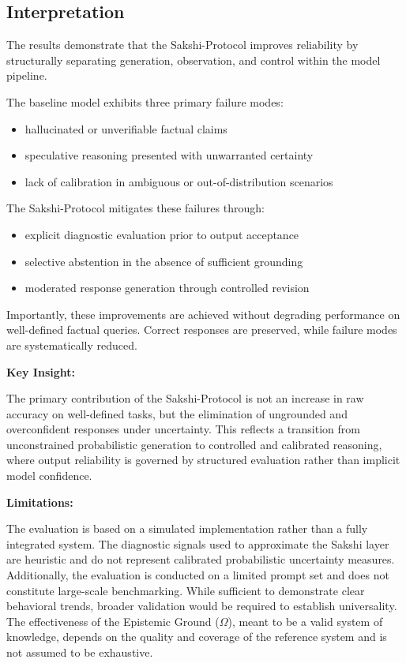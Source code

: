 \documentclass[12pt,a4paper]{article}
\begin{document}
\subsection{Interpretation}

The results demonstrate that the Sakshi-Protocol improves reliability by structurally separating generation, observation, and control within the model pipeline.

The baseline model exhibits three primary failure modes:
\begin{itemize}
\item hallucinated or unverifiable factual claims
\item speculative reasoning presented with unwarranted certainty
\item lack of calibration in ambiguous or out-of-distribution scenarios
\end{itemize}

The Sakshi-Protocol mitigates these failures through:
\begin{itemize}
\item explicit diagnostic evaluation prior to output acceptance
\item selective abstention in the absence of sufficient grounding
\item moderated response generation through controlled revision
\end{itemize}

Importantly, these improvements are achieved without degrading performance on well-defined factual queries. Correct responses are preserved, while failure modes are systematically reduced.

\textbf{Key Insight:}

The primary contribution of the Sakshi-Protocol is not an increase in raw accuracy on well-defined tasks, but the elimination of ungrounded and overconfident responses under uncertainty. This reflects a transition from unconstrained probabilistic generation to controlled and calibrated reasoning, where output reliability is governed by structured evaluation rather than implicit model confidence.

\textbf{Limitations:}

The evaluation is based on a simulated implementation rather than a fully integrated system. The diagnostic signals used to approximate the Sakshi layer are heuristic and do not represent calibrated probabilistic uncertainty measures. Additionally, the evaluation is conducted on a limited prompt set and does not constitute large-scale benchmarking. While sufficient to demonstrate clear behavioral trends, broader validation would be required to establish universality. The effectiveness of the Epistemic Ground ($\Omega$), meant to be a valid system of knowledge, depends on the quality and coverage of the reference system and is not assumed to be exhaustive.
\end{document}
